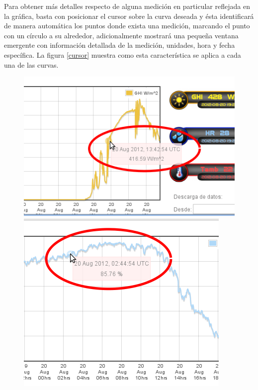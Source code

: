 Para obtener más detalles respecto de alguna medición en particular reflejada en la gráfica, basta con posicionar el cursor sobre la curva deseada y ésta identificará de manera automática los puntos donde exista una medición, marcando el punto con un círculo a su alrededor, adicionalmente mostrará una pequeña ventana emergente con información detallada de la medición, unidades, hora y fecha específica. La figura \ref{cursor} muestra como esta característica se aplica a cada una de las curvas.

\begin{figure}[ht]
	\begin{minipage}[b]{0.32\linewidth}
        	\centering
        	\includegraphics[scale=0.35]{./images/cap5chap1img4-1}
	\end{minipage}
	\begin{minipage}[b]{0.32\linewidth}
                \centering
                \includegraphics[scale=0.35]{./images/cap5chap1img4-2}

\end{minipage}
\end{figure}
